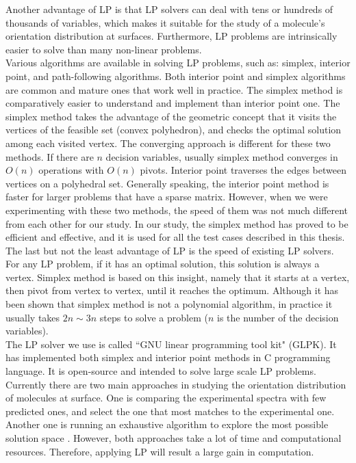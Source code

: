 Another advantage of LP is that LP solvers can deal with tens or hundreds of thousands of variables, which makes it suitable for the study of a molecule's orientation distribution at surfaces. Furthermore, LP problems are intrinsically easier to solve than many non-linear problems. \\

Various algorithms are available in solving LP problems, such as: simplex, interior point, and path-following algorithms. Both interior point and simplex algorithms are common and mature ones that work well in practice. The simplex method is comparatively easier to understand and implement than interior point one. The simplex method takes the advantage of the geometric concept that it visits the vertices of the feasible set (convex polyhedron), and checks the optimal solution among each visited vertex. The converging approach is different for these two methods. If there are $n$ decision variables, usually simplex method converges in $O(n)$ operations with $O(n)$ pivots. Interior point traverses the edges between vertices on a polyhedral set. Generally speaking, the interior point method is faster for larger problems that have a sparse matrix. However, when we were experimenting with these two methods, the speed of them was not much different from each other for our study. In our study, the simplex method has proved to be efficient and effective, and it is used for all the test cases described in this thesis. \\

The last but not the least advantage of LP is the speed of existing LP solvers. For any LP problem, if it has an optimal solution, this solution is always a vertex. Simplex method is based on this insight, namely that it starts at a vertex, then pivot from vertex to vertex, until it reaches the optimum. Although it has been shown that simplex method is not a polynomial algorithm, in practice it usually takes $2n\sim3n$ steps to solve a problem ($n$ is the number of the decision variables). \\

The LP solver we use is called ``GNU linear programming tool kit" (GLPK). It has implemented both simplex and interior point methods in C programming language. It is open-source and intended to solve large scale LP problems. \\

Currently there are two main approaches in studying the orientation distribution of molecules at surface. One is comparing the experimental spectra with few predicted ones, and select the one that most matches to the experimental one. Another one is running an exhaustive algorithm to explore the most possible solution space \cite{hore0033-rotations}. However, both approaches take a lot of time and computational resources. Therefore, applying LP will result a large gain in computation.\\

